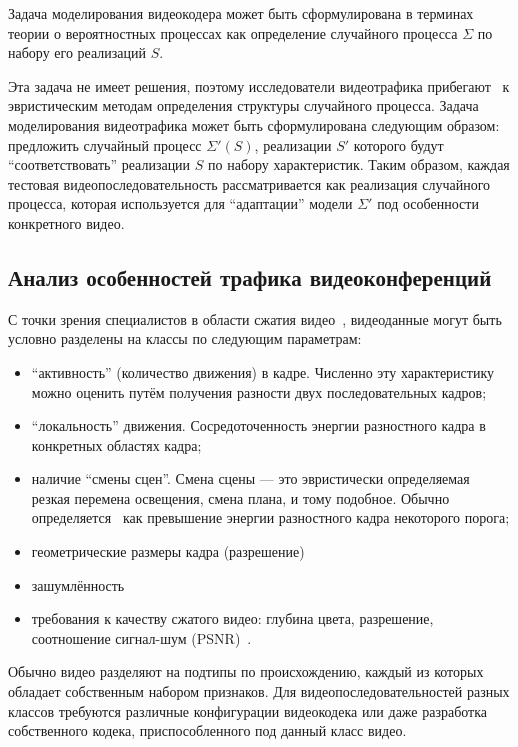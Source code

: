 Задача моделирования видеокодера может быть сформулирована в терминах
теории о вероятностных процессах как определение случайного
процесса $\Sigma$ по набору его реализаций $S$.

Эта задача не имеет решения, поэтому исследователи видеотрафика
прибегают~\cite{characteristics2013} к эвристическим методам определения структуры
случайного процесса. Задача моделирования видеотрафика может быть
сформулирована следующим образом: предложить случайный процесс
$\Sigma'(S)$, реализации $S'$ которого будут ``соответствовать''
реализации $S$ по набору характеристик. Таким образом,
каждая тестовая видеопоследовательность рассматривается
как реализация случайного процесса, которая используется
для ``адаптации'' модели $\Sigma'$ под особенности
конкретного видео.

\subsection{Анализ особенностей трафика видеоконференций}

С точки зрения специалистов в области сжатия видео~\cite{survey2013},
видеоданные могут быть условно разделены на классы по
следующим параметрам:

\begin{itemize}
    \item ``активность'' (количество движения) в кадре. Численно 
        эту характеристику можно оценить путём получения разности
        двух последовательных кадров;
    \item ``локальность'' движения. Сосредоточенность энергии
        разностного кадра в конкретных областях кадра;
    \item наличие ``смены сцен''. Смена сцены --- это эвристически
        определяемая резкая перемена освещения, смена плана,
        и тому подобное. Обычно определяется~\cite{scenedetection} как превышение
        энергии разностного кадра некоторого порога;
    \item геометрические размеры кадра (разрешение)
    \item зашумлённость
    \item требования к качеству сжатого видео: глубина цвета,
        разрешение, соотношение сигнал-шум (PSNR)~\cite{salomoncomp}.
\end{itemize}

Обычно видео разделяют на подтипы по происхождению,
каждый из которых обладает собственным набором признаков.
Для видеопоследовательностей разных классов требуются
различные конфигурации видеокодека или даже разработка
собственного кодека, приспособленного под данный класс видео.


